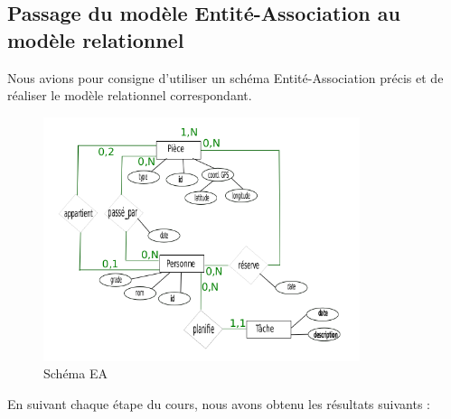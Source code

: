 \subsection{Passage du modèle Entité-Association au modèle relationnel}
Nous avions pour consigne d'utiliser un schéma Entité-Association précis et de réaliser le modèle relationnel correspondant.

\begin{figure}[H]
	\begin{center}
	\includegraphics[width=350px]{./images/SchemaEA.png}
	\end{center}
\caption{Schéma EA}
\label{Schéma EA}
\end{figure}

En suivant chaque étape du cours, nous avons obtenu les résultats suivants :

